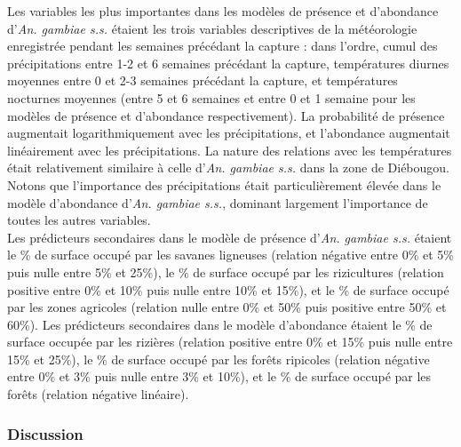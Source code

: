 \documentclass[12pt,twoside]{reedthesis}
\begin{document}
Les variables les plus importantes dans les modèles de présence et d'abondance d'\emph{An. gambiae s.s.} étaient les trois variables descriptives de la météorologie enregistrée pendant les semaines précédant la capture : dans l'ordre, cumul des précipitations entre 1-2 et 6 semaines précédant la capture, températures diurnes moyennes entre 0 et 2-3 semaines précédant la capture, et températures nocturnes moyennes (entre 5 et 6 semaines et entre 0 et 1 semaine pour les modèles de présence et d'abondance respectivement). La probabilité de présence augmentait logarithmiquement avec les précipitations, et l'abondance augmentait linéairement avec les précipitations. La nature des relations avec les températures était relativement similaire à celle d'\emph{An. gambiae s.s.} dans la zone de Diébougou. Notons que l'importance des précipitations était particulièrement élevée dans le modèle d'abondance d'\emph{An. gambiae s.s.}, dominant largement l'importance de toutes les autres variables.\\

Les prédicteurs secondaires dans le modèle de présence d'\emph{An. gambiae s.s.} étaient le \% de surface occupé par les savanes ligneuses (relation négative entre 0\% et 5\% puis nulle entre 5\% et 25\%), le \% de surface occupé par les rizicultures (relation positive entre 0\% et 10\% puis nulle entre 10\% et 15\%), et le \% de surface occupé par les zones agricoles (relation nulle entre 0\% et 50\% puis positive entre 50\% et 60\%). Les prédicteurs secondaires dans le modèle d'abondance étaient le \% de surface occupée par les rizières (relation positive entre 0\% et 15\% puis nulle entre 15\% et 25\%), le \% de surface occupé par les forêts ripicoles (relation négative entre 0\% et 3\% puis nulle entre 3\% et 10\%), et le \% de surface occupé par les forêts (relation négative linéaire).\\

\hypertarget{discussion}{%
\subsubsection{Discussion}\label{discussion}}
\end{document}
